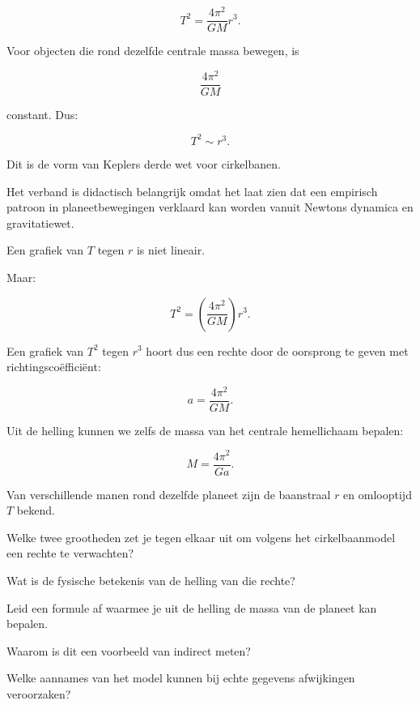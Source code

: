 \documentclass{ximera}
\begin{document}
\[
\boxed{
T^2
=
\frac{4\pi^2}{GM}r^3.
}
\]

Voor objecten die rond dezelfde centrale massa bewegen, is

\[
\frac{4\pi^2}{GM}
\]

constant. Dus:

\[
\boxed{
T^2\sim r^3.
}
\]

Dit is de vorm van Keplers derde wet voor cirkelbanen.

Het verband is didactisch belangrijk omdat het laat zien dat een
empirisch patroon in planeetbewegingen verklaard kan worden vanuit
Newtons dynamica en gravitatiewet.



Een grafiek van $T$ tegen $r$ is niet lineair.

Maar:

\[
T^2
=
\left(\frac{4\pi^2}{GM}\right)r^3.
\]

Een grafiek van $T^2$ tegen $r^3$ hoort dus een rechte door de oorsprong
te geven met richtingscoëfficiënt:

\[
\boxed{
a=\frac{4\pi^2}{GM}.
}
\]

Uit de helling kunnen we zelfs de massa van het centrale hemellichaam
bepalen:

\[
\boxed{
M=\frac{4\pi^2}{Ga}.
}
\]


\begin{oefening}{\oefG}

Van verschillende manen rond dezelfde planeet zijn de baanstraal $r$
en omlooptijd $T$ bekend.

\begin{question}
Welke twee grootheden zet je tegen elkaar uit om volgens het
cirkelbaanmodel een rechte te verwachten?
\end{question}

\begin{question}
Wat is de fysische betekenis van de helling van die rechte?
\end{question}

\begin{question}
Leid een formule af waarmee je uit de helling de massa van de planeet
kan bepalen.
\end{question}

\begin{question}
Waarom is dit een voorbeeld van indirect meten?
\end{question}

\begin{question}
Welke aannames van het model kunnen bij echte gegevens afwijkingen
veroorzaken?
\end{question}

\end{oefening}
\end{document}
